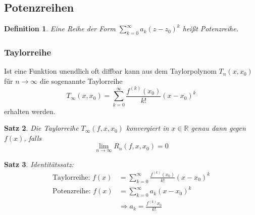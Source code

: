 \documentclass[12pt,a4paper]{report}%
\newtheorem{satz}{Satz}[section]
\newtheorem{definition}[satz]{Definition}
\numberwithin{equation}{section}
\newcommand{\R}{\mathbb{R}} %
\numberwithin{equation}{subsection}
\begin{document}
  \subsection{Potenzreihen}
  \begin{definition}
    Eine Reihe der Form $\sum\limits_{k = 0}^\infty a_k(z-z_0)^k$ heißt Potenzreihe.
  \end{definition}
	  \subsubsection{Taylorreihe}
	  Ist eine Funktion unendlich oft diffbar kann aus dem Taylorpolynom $T_n(x,x_0)$ für $n\rightarrow \infty$ die sogenannte Taylorreihe
	  \begin{equation}
	   T_\infty (x,x_0) = \sum\limits_{k = 0}^\infty \frac{f^{(k)}(x_0)}{k!}(x-x_0)^k
	  \end{equation}
	  erhalten werden.
	  \begin{satz}
	    Die Taylorreihe $T_\infty(f,x,x_0)$ konvergiert in $x \in \R$ genau dann gegen $f(x)$, falls
	    \begin{equation*}
	      \lim\limits_{n \rightarrow \infty} R_n(f,x,x_0) = 0
	    \end{equation*}
	  \end{satz}
	  \begin{satz}
	    Identitätssatz:
	    \begin{align}
	      \text{Taylorreihe: } f(x) &= \sum\limits_{k = 0}^\infty \frac{f^{(k)}(x_0)}{k!}(x-x_0)^k \nonumber \\
	      \text{Potenzreihe: } f(x) &= \sum\limits_{k = 0}^\infty a_k (x-x_0)^k \nonumber \\
	      &\Rightarrow a_k = \frac{f^{(k)}x_0}{k!}
	    \end{align}
	  \end{satz}
\end{document}
